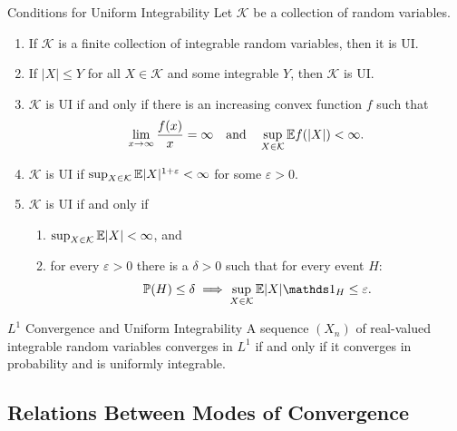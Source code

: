\begin{prop}{Conditions for Uniform Integrability}{}
	Let $\mathcal{K}$ be a collection of random variables.
	\begin{enumerate}
		\item If $\mathcal{K}$ is a finite collection of integrable random variables, then it is UI.
		\item If $|X| \le Y$ for all $X \in \mathcal{K}$ and some integrable $Y$, then $\mathcal{K}$ is UI.
		\item $\mathcal{K}$ is UI if and only if there is an increasing convex function $f$ such that
		      \begin{equation*}
			      \lim_{x \to \infty} \frac{f(x)}{x} = \infty \quad \text{and} \quad \sup_{X \in \mathcal{K}} \mathbb{E} f(|X|) < \infty.
		      \end{equation*}
		\item $\mathcal{K}$ is UI if $\sup_{X \in \mathcal{K}} \mathbb{E} |X|^{1+\varepsilon} < \infty$ for some $\varepsilon > 0$.
		\item $\mathcal{K}$ is UI if and only if
		      \begin{enumerate}
			      \item $\sup_{X \in \mathcal{K}} \mathbb{E} |X| < \infty$, and
			      \item for every $\varepsilon > 0$ there is a $\delta > 0$ such that for every event $H$:
			            \begin{equation}
				            \Prob(H) \le \delta \implies \sup_{X \in \mathcal{K}} \E |X| \I_{H} \le \varepsilon.
				            \label{eq:UniformIntegrabilityEquivalence}
			            \end{equation}
		      \end{enumerate}
	\end{enumerate}
\end{prop}

\begin{thm}{$L^1$ Convergence and Uniform Integrability}{}
	A sequence $(X_n)$ of real-valued integrable random variables converges in $L^1$ if and only if it converges in probability and is uniformly integrable.
\end{thm}

\subsection{Relations Between Modes of Convergence}


